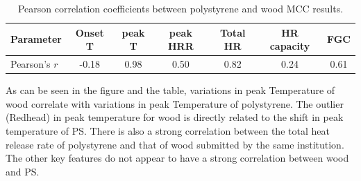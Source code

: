 \documentclass{book}
\begin{document}
\begin{table}[ht]
	\centering
 \caption{Pearson correlation coefficients between polystyrene and wood MCC results.}
	\label{tab:MCC Pearson}
	\begin{tabular}{lcccccc}
		\hline
		Parameter & Onset T & peak T & peak HRR &  Total HR & HR capacity & FGC\\
		\hline
		Pearson’s $r$ & -0.18 & 0.98 & 0.50 & 0.82 & 0.24 & 0.61\\
		\hline
	\end{tabular}
\end{table}

As can be seen in the figure and the table, variations in peak Temperature of wood correlate with variations in peak Temperature of polystyrene. The outlier (Redhead) in peak temperature for wood is directly related to the shift in peak temperature of PS. There is also a strong correlation between the total heat release rate of polystyrene and that of wood submitted by the same institution. The other key features do not appear to have a strong correlation between wood and PS.
\end{document}
